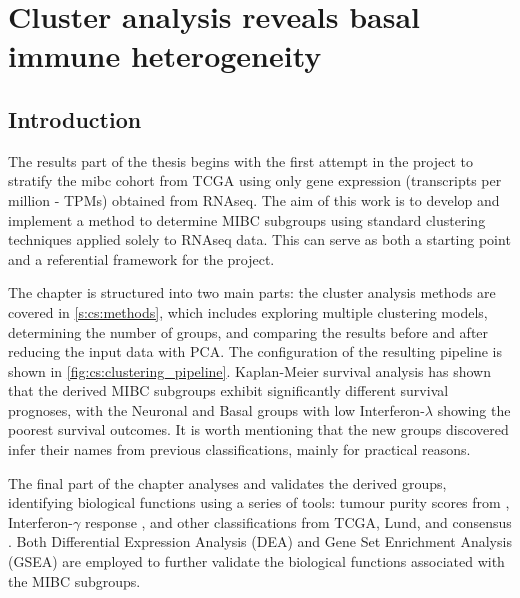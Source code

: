 \chapter{Cluster analysis reveals basal immune heterogeneity} \label{s:clustering_analysis}

\vspace{3mm}
\vspace{3mm}

\section{Introduction}

The results part of the thesis begins with the first attempt in the project to stratify the \acrfull{mibc} cohort from TCGA using only gene expression (transcripts per million - TPMs) obtained from RNAseq. The aim of this work is to develop and implement a method to determine MIBC subgroups using standard clustering techniques applied solely to RNAseq data. This can serve as both a starting point and a referential framework for the project.

The chapter is structured into two main parts: the cluster analysis methods are covered in \cref{s:cs:methods}, which includes exploring multiple clustering models, determining the number of groups, and comparing the results before and after reducing the input data with PCA. The configuration of the resulting pipeline is shown in \cref{fig:cs:clustering_pipeline}. Kaplan-Meier survival analysis has shown that the derived MIBC subgroups exhibit significantly different survival prognoses, with the Neuronal and Basal groups with low Interferon-$\lambda$ showing the poorest survival outcomes. It is worth mentioning that the new groups discovered infer their names from previous classifications, mainly for practical reasons.

The final part of the chapter analyses and validates the derived groups, identifying biological functions using a series of tools: tumour purity scores from \citet{Yoshihara2013-wq}, Interferon-$\gamma$ response \citet{Baker2022-bj}, and other classifications from TCGA, Lund, and consensus \citep{Robertson2017-mg,Marzouka2018-ge,Kamoun2020-tj}. Both Differential Expression Analysis (DEA) and Gene Set Enrichment Analysis (GSEA) are employed to further validate the biological functions associated with the MIBC subgroups.



